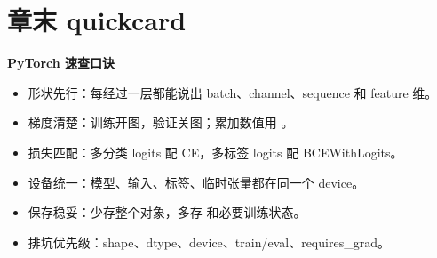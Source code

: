 \section{章末 quickcard}

\begin{quickcard}
\textbf{PyTorch 速查口诀}
\begin{itemize}
\item 形状先行：每经过一层都能说出 batch、channel、sequence 和 feature 维。
\item 梯度清楚：训练开图，验证关图；累加数值用 。
\item 损失匹配：多分类 logits 配 CE，多标签 logits 配 BCEWithLogits。
\item 设备统一：模型、输入、标签、临时张量都在同一个 device。
\item 保存稳妥：少存整个对象，多存  和必要训练状态。
\item 排坑优先级：shape、dtype、device、train/eval、requires\_grad。
\end{itemize}
\end{quickcard}
